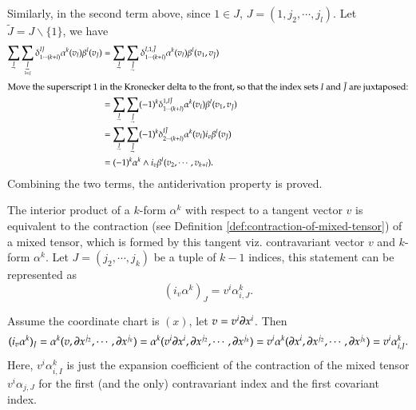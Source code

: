 \documentclass[11pt, a4paper]{book}
\begin{document}
\begin{Proof}
  Similarly, in the second term above, since $1 \in J$, $J=(1,j_2,\cdots,j_l)$. Let
  $\tilde{J}=J\backslash\{1\}$, we have
  \begin{align*}
    \sum_{\underaccent{\rightharpoondown}{I}} \sum_{\underset{1 \in
    J}{\underaccent{\rightharpoondown}{J}}} \delta_{1 \cdots (k+l)}^{IJ} \alpha^k(v_I)
    \beta^l(v_J)
    &= \sum_{\underaccent{\rightharpoondown}{I}}
      \sum_{\underaccent{\rightharpoondown}{\tilde{J}}} \delta_{1 \cdots
      (k+l)}^{I,1,\tilde{J}} \alpha^k(v_I) \beta^l(v_1, v_{\tilde{J}}) \\
    \intertext{Move the superscript 1 in the Kronecker delta to the front, so that the
    index sets $I$ and $\tilde{J}$ are juxtaposed:}
    &= \sum_{\underaccent{\rightharpoondown}{I}}
      \sum_{\underaccent{\rightharpoondown}{\tilde{J}}} (-1)^k \delta_{1 \cdots
      (k+l)}^{1,I\tilde{J}} \alpha^k(v_I) \beta^l(v_1, v_{\tilde{J}}) \\
    &= \sum_{\underaccent{\rightharpoondown}{I}}
      \sum_{\underaccent{\rightharpoondown}{\tilde{J}}} (-1)^k \delta_{2 \cdots
      (k+l)}^{I\tilde{J}} \alpha^k(v_I) i_v\beta^l(v_{\tilde{J}}) \\
    &= (-1)^k \alpha^k \wedge i_v\beta^l(v_2,\cdots,v_{k+l}).
  \end{align*}
  Combining the two terms, the antiderivation property is proved.
\end{Proof}

\begin{Proposition}
  The interior product of a $k$-form $\alpha^k$ with respect to a tangent vector $v$ is
  equivalent to the contraction (see Definition \ref{def:contraction-of-mixed-tensor}) of
  a mixed tensor, which is formed by this tangent viz. contravariant vector $v$ and
  $k$-form $\alpha^k$. Let $J=(j_2,\cdots,j_k)$ be a tuple of $k-1$ indices, this
  statement can be represented as
  \begin{equation}
    (i_v\alpha^k)_J = v^i\alpha^k_{i,J}.
  \end{equation}
\end{Proposition}

\begin{Proof}
  Assume the coordinate chart is $(x)$, let $v=v^i \boldsymbol{\partial}x^i$. Then
  \begin{equation}
    (i_v\alpha^k)_J = \alpha^k(v, \boldsymbol{\partial}x^{j_2},\cdots,\boldsymbol{\partial}x^{j_k}) =
    \alpha^k(v^i \boldsymbol{\partial}x^i, \boldsymbol{\partial}x^{j_2},\cdots,\boldsymbol{\partial}x^{j_k}) = v^i
    \alpha^k(\boldsymbol{\partial}x^i, \boldsymbol{\partial}x^{j_2},\cdots,\boldsymbol{\partial}x^{j_k}) = v^i\alpha^k_{i,J}.
  \end{equation}
  Here, $v^i\alpha^k_{i,I}$ is just the expansion coefficient of the contraction of the
  mixed tensor $v^i \alpha_{j,J}$ for the first (and the only) contravariant index and the
  first covariant index.
\end{Proof}
\end{document}
